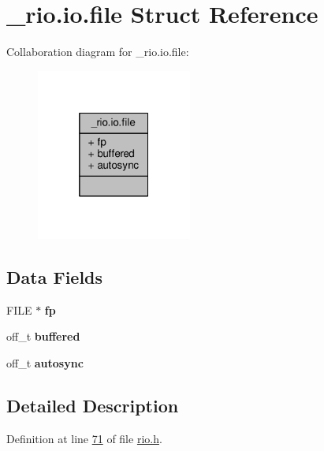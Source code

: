 \hypertarget{struct__rio_8io_8file}{}\section{\+\_\+rio.\+io.\+file Struct Reference}
\label{struct__rio_8io_8file}


Collaboration diagram for \+\_\+rio.\+io.\+file\+:\nopagebreak
\begin{figure}[H]
\begin{center}
\leavevmode
\includegraphics[width=145pt]{struct__rio_8io_8file__coll__graph}
\end{center}
\end{figure}
\subsection*{Data Fields}
\begin{DoxyCompactItemize}
\item 
\mbox{\label{struct__rio_8io_8file_a0666f0acdeed38d4cd9084ade1739498}} 
F\+I\+LE $\ast$ {\bfseries fp}
\item 
\mbox{\label{struct__rio_8io_8file_a8b365ffbd5d92a1b9c20f227a4b6fcec}} 
off\+\_\+t {\bfseries buffered}
\item 
\mbox{\label{struct__rio_8io_8file_a7436fa807f1e0acb8fe0541598ad3ab1}} 
off\+\_\+t {\bfseries autosync}
\end{DoxyCompactItemize}


\subsection{Detailed Description}


Definition at line \hyperlink{rio_8h_source_l00071}{71} of file \hyperlink{rio_8h_source}{rio.\+h}.



